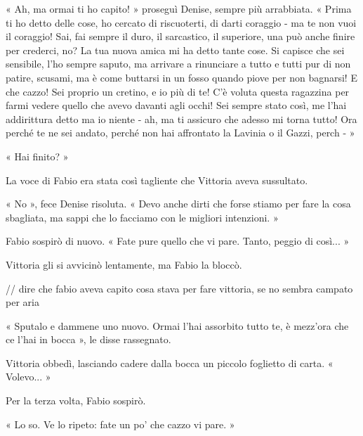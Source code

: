 « Ah, ma ormai ti ho capito! » proseguì Denise, sempre più arrabbiata. « Prima ti ho detto delle cose, ho cercato di riscuoterti, di darti coraggio - ma te non vuoi il coraggio! Sai, fai sempre il duro, il sarcastico, il superiore, una può anche finire per crederci, no? La tua nuova amica mi ha detto tante cose. Si capisce che sei sensibile, l'ho sempre saputo, ma arrivare a rinunciare a tutto e tutti pur di non patire, scusami, ma è come buttarsi in un fosso quando piove per non bagnarsi! E che cazzo! Sei proprio un cretino, e io più di te! C'è voluta questa ragazzina per farmi vedere quello che avevo davanti agli occhi! Sei sempre stato così, me l'hai addirittura detto ma io niente - ah, ma ti assicuro che adesso mi torna tutto! Ora perché te ne sei andato, perché non hai affrontato la Lavinia o il Gazzi, perch - »

« Hai finito? »

La voce di Fabio era stata così tagliente che Vittoria aveva sussultato.

« No », fece Denise risoluta. « Devo anche dirti che forse stiamo per fare la cosa sbagliata, ma sappi che lo facciamo con le migliori intenzioni. »

Fabio sospirò di nuovo. « Fate pure quello che vi pare. Tanto, peggio di così... »

Vittoria gli si avvicinò lentamente, ma Fabio la bloccò.

// dire che fabio aveva capito cosa stava per fare vittoria, se no sembra campato per aria

« Sputalo e dammene uno nuovo. Ormai l'hai assorbito tutto te, è mezz'ora che ce l'hai in bocca », le disse rassegnato.

Vittoria obbedì, lasciando cadere dalla bocca un piccolo foglietto di carta. « Volevo... »

Per la terza volta, Fabio sospirò.

« Lo so. Ve lo ripeto: fate un po' che cazzo vi pare. »
